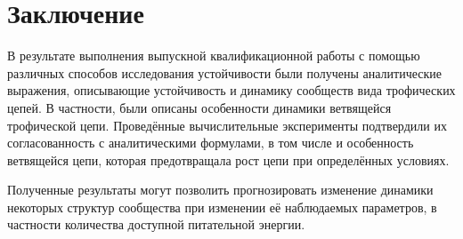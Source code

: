\section{Заключение}
    В результате выполнения выпускной квалификационной работы с помощью различных способов исследования устойчивости были получены аналитические выражения, описывающие устойчивость и динамику сообществ вида трофических цепей. В частности, были описаны особенности динамики ветвящейся трофической цепи. Проведённые вычислительные эксперименты подтвердили их согласованность с аналитическими формулами, в том числе и особенность ветвящейся цепи, которая предотвращала рост цепи при определённых условиях.
    
    Полученные результаты могут позволить прогнозировать изменение динамики некоторых структур сообщества при изменении её наблюдаемых параметров, в частности количества доступной питательной энергии.
